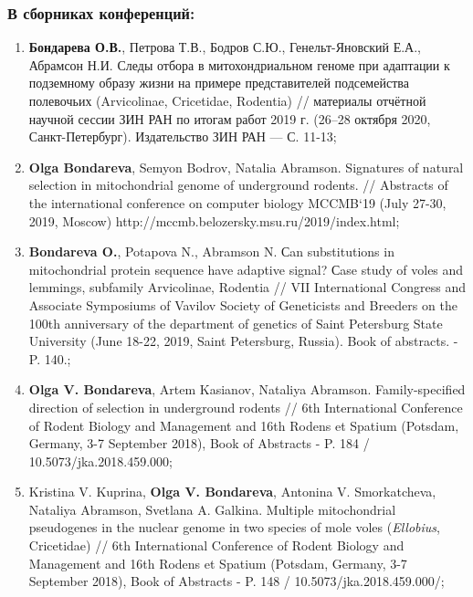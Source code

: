 \begin{small}
\subsubsection*{В сборниках конференций:}
\begin{enumerate}
	
\item[\textbullet] \textbf{Бондарева О.В.}, Петрова Т.В., Бодров С.Ю., Генельт-Яновский Е.А., Абрамсон Н.И. Следы отбора в митохондриальном геноме при адаптации к подземному образу жизни на примере представителей подсемейства полевочьих (Arvicolinae, Cricetidae, Rodentia) // материалы отчётной научной сессии ЗИН РАН по итогам работ 2019 г. (26--28 октября 2020, Санкт-Петербург). Издательство ЗИН РАН --- С. 11-13;

\item[\textbullet] \textbf{Olga Bondareva}, Semyon Bodrov, Natalia Abramson. Signatures of natural selection in mitochondrial genome of underground rodents. // Abstracts of the international conference on computer biology MCCMB`19 (July 27-30, 2019, Moscow) http://mccmb.belozersky.msu.ru/2019/index.html;

\item[\textbullet] \textbf{Bondareva O.}, Potapova N., Abramson N. Сan substitutions in mitochondrial protein sequence have adaptive signal? Сase study of voles and lemmings, subfamily Arvicolinae, Rodentia // VII International Congress and Associate Symposiums of Vavilov Society of Geneticists and Breeders on the 100th anniversary of the department of genetics of Saint Petersburg State University (June 18-22, 2019, Saint Petersburg, Russia). Book of abstracts. - P. 140.;

\item[\textbullet] \textbf{Olga V. Bondareva}, Artem Kasianov, Nataliya Abramson. Family-specified direction of selection in underground rodents // 6th International Conference of Rodent Biology and Management and 16th Rodens et Spatium (Potsdam, Germany, 3-7 September 2018), Book of Abstracts - P. 184 / 10.5073/jka.2018.459.000;

\item[\textbullet] Kristina V. Kuprina, \textbf{Olga V. Bondareva}, Antonina V. Smorkatcheva, Nataliya Abramson, Svetlana A. Galkina. Multiple mitochondrial pseudogenes in the nuclear genome in two species of mole voles (\textit{Ellobius}, Cricetidae) // 6th International Conference of Rodent Biology and Management and 16th Rodens et Spatium (Potsdam, Germany, 3-7 September 2018), Book of Abstracts - P. 148 / 10.5073/jka.2018.459.000/;


\end{enumerate}
\end{small}

